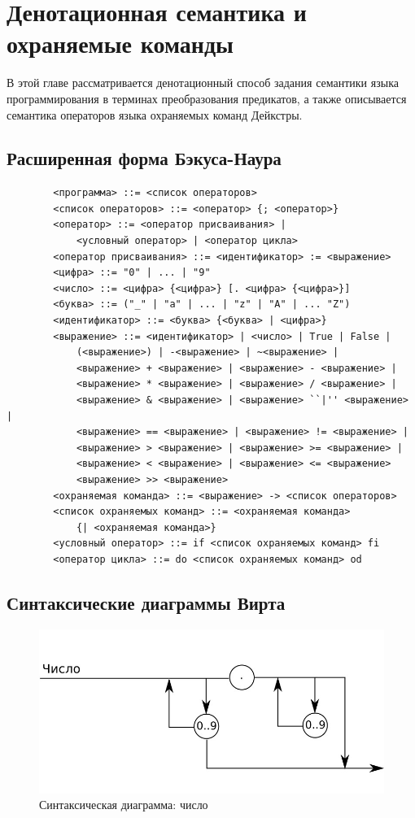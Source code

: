 \chapter{Денотационная семантика и охраняемые команды} \label{ch1}
В этой главе рассматривается денотационный способ задания семантики 
языка программирования в терминах преобразования предикатов,
а также описывается семантика операторов языка охраняемых команд Дейкстры.

\section{Расширенная форма Бэкуса-Наура}
	\begin{verbatim}
	    <программа> ::= <список операторов>
	    <список операторов> ::= <оператор> {; <оператор>}
	    <оператор> ::= <оператор присваивания> |
	        <условный оператор> | <оператор цикла>
	    <оператор присваивания> ::= <идентификатор> := <выражение>
    	<цифра> ::= "0" | ... | "9"
    	<число> ::= <цифра> {<цифра>} [. <цифра> {<цифра>}]
    	<буква> ::= ("_" | "a" | ... | "z" | "A" | ... "Z")
    	<идентификатор> ::= <буква> {<буква> | <цифра>}
	    <выражение> ::= <идентификатор> | <число> | True | False |
	        (<выражение>) | -<выражение> | ~<выражение> |
	        <выражение> + <выражение> | <выражение> - <выражение> |
	        <выражение> * <выражение> | <выражение> / <выражение> |
	        <выражение> & <выражение> | <выражение> ``|'' <выражение> |
	        <выражение> == <выражение> | <выражение> != <выражение> |
	        <выражение> > <выражение> | <выражение> >= <выражение> |
	        <выражение> < <выражение> | <выражение> <= <выражение>
	        <выражение> >> <выражение>
	    <охраняемая команда> ::= <выражение> -> <список операторов>
	    <список охраняемых команд> ::= <охраняемая команда> 
	        {| <охраняемая команда>}
	    <условный оператор> ::= if <список охраняемых команд> fi
	    <оператор цикла> ::= do <список охраняемых команд> od
	\end{verbatim}

\section{Синтаксические диаграммы Вирта}
	\begin{figure}[H]
	\begin{center}
		\includegraphics[scale=0.5]{my_folder/images/virth/number}
		\caption{Синтаксическая диаграмма: число}
	\end{center}
    \end{figure}
    
